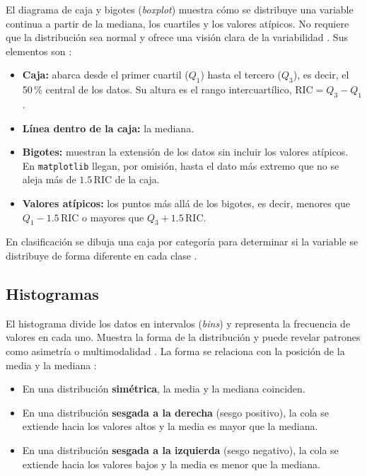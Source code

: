 \documentclass[11pt,letterpaper]{article}
\begin{document}
El diagrama de caja y bigotes (\textit{boxplot}) muestra cómo se distribuye una variable continua a partir de la mediana, los cuartiles y los valores atípicos. No requiere que la distribución sea normal y ofrece una visión clara de la variabilidad \parencite{tecnm2026_documento_fuente,brownlee2019}. Sus elementos son \parencite{tecnm2026_documento_fuente,bruce2020}:

\begin{itemize}
    \item \textbf{Caja:} abarca desde el primer cuartil ($Q_1$) hasta el tercero ($Q_3$), es decir, el 50\,\% central de los datos. Su altura es el rango intercuartílico, $\text{RIC} = Q_3 - Q_1$.
    \item \textbf{Línea dentro de la caja:} la mediana.
    \item \textbf{Bigotes:} muestran la extensión de los datos sin incluir los valores atípicos. En \texttt{matplotlib} llegan, por omisión, hasta el dato más extremo que no se aleja más de $1.5\,\text{RIC}$ de la caja.
    \item \textbf{Valores atípicos:} los puntos más allá de los bigotes, es decir, menores que $Q_1 - 1.5\,\text{RIC}$ o mayores que $Q_3 + 1.5\,\text{RIC}$.
\end{itemize}

En clasificación se dibuja una caja por categoría para determinar si la variable se distribuye de forma diferente en cada clase \parencite{tecnm2026_documento_fuente}.

\subsection{Histogramas}

El histograma divide los datos en intervalos (\textit{bins}) y representa la frecuencia de valores en cada uno. Muestra la forma de la distribución y puede revelar patrones como asimetría o multimodalidad \parencite{tecnm2026_documento_fuente,brownlee2019}. La forma se relaciona con la posición de la media y la mediana \parencite{tecnm2026_documento_fuente}:

\begin{itemize}
    \item En una distribución \textbf{simétrica}, la media y la mediana coinciden.
    \item En una distribución \textbf{sesgada a la derecha} (sesgo positivo), la cola se extiende hacia los valores altos y la media es mayor que la mediana.
    \item En una distribución \textbf{sesgada a la izquierda} (sesgo negativo), la cola se extiende hacia los valores bajos y la media es menor que la mediana.
\end{itemize}
\end{document}
